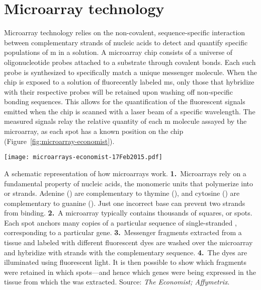 \section{Microarray technology}
\label{sec:microarray-methods}

Microarray technology relies on the non-covalent, sequence-specific interaction
between complementary strands of nucleic acids\cite{watson_molecular_1953} to
detect and quantify specific populations of m in a solution.  A
microarray chip consists of a universe of oligonucleotide probes attached to a
substrate through covalent bonds.  Each such probe is synthesized to
specifically match a unique messenger  molecule.  When the chip
is exposed to a solution of fluorecently labeled ms, only those
that hybridize with their respective probes will be retained upon washing off
non-specific bonding sequences.  This allows for the quantification of the
fluorescent signals emitted when the chip is scanned with a laser beam of a
specific wavelength.  The measured signals relay the relative quantity of each
m molecule assayed by the microarray, as each spot has a known
position on the chip (Figure~\ref{fig:microarray-economist}).


\begin{marginfigure}%
  \begin{center}
    \texttt{[image: microarrays-economist-17Feb2015.pdf]}
    \caption[Schematic representation of how microarrays work]{A schematic
      representation of how microarrays work.  \textbf{1.}~Microarrays rely on a
      fundamental property of nucleic acids, the monomeric units that polymerize
      into  or  strands.  Adenine ()
      are complementary to thymine (), and cytosine ()
      are complementary to guanine ().  Just one incorrect base can
      prevent two strands from binding.  \textbf{2.}~A microarray typically
      contains thousands of squares, or spots.  Each spot anchors many copies of
      a particular sequence of single-stranded , corresponding to
      a particular gene.  \textbf{3.}~Messenger  fragments
      extracted from a tissue and labeled with different fluorescent dyes are
      washed over the microarray and hybridize with  strands with
      the complementary sequence.  \textbf{4.}~The dyes are illuminated using
      fluorescent light.  It is then possible to show which 
      fragments were retained in which spots---and hence which genes were being
      expressed in the tissue from which the  was extracted.
      Source: \emph{The Economist; Affymetrix}.}
    \label{fig:microarray-economist}%
  \end{center}
\end{marginfigure}

